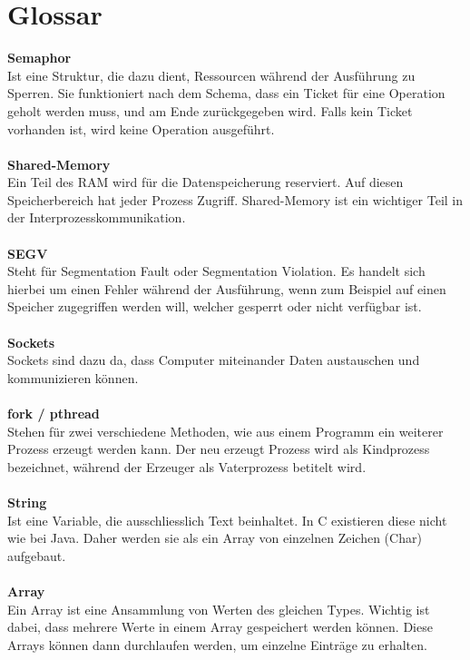 \documentclass[12pt,a4paper,ngerman]{report}
\begin{document}
\chapter*{Glossar}
\textbf{Semaphor}\\
Ist eine Struktur, die dazu dient, Ressourcen während der Ausführung zu Sperren. Sie funktioniert nach dem Schema, dass ein Ticket für eine Operation geholt werden muss, und am Ende zurückgegeben wird. Falls kein Ticket vorhanden ist, wird keine Operation ausgeführt.\\
\\
\textbf{Shared-Memory}\\
Ein Teil des RAM wird für die Datenspeicherung reserviert. Auf diesen Speicherbereich hat jeder Prozess Zugriff. Shared-Memory ist ein wichtiger Teil in der Interprozesskommunikation.\\
\\
\textbf{SEGV}\\
Steht für Segmentation Fault oder Segmentation Violation. Es handelt sich hierbei um einen Fehler während der Ausführung, wenn zum Beispiel auf einen Speicher zugegriffen werden will, welcher gesperrt oder nicht verfügbar ist. \\
\\
\textbf{Sockets}\\
Sockets sind dazu da, dass Computer miteinander Daten austauschen und kommunizieren können. \\
\\
\textbf{fork / pthread}\\
Stehen für zwei verschiedene Methoden, wie aus einem Programm ein weiterer Prozess erzeugt werden kann. Der neu erzeugt Prozess wird als Kindprozess bezeichnet, während der Erzeuger als Vaterprozess betitelt wird.\\
\\
\textbf{String}\\
Ist eine Variable, die ausschliesslich Text beinhaltet. In C existieren diese nicht wie bei Java. Daher werden sie als ein Array von einzelnen Zeichen (Char) aufgebaut.\\
\\
\textbf{Array}\\
Ein Array ist eine Ansammlung von Werten des gleichen Types. Wichtig ist dabei, dass mehrere Werte in einem Array gespeichert werden können. Diese Arrays können dann durchlaufen werden, um einzelne Einträge zu erhalten.


\nocite{socketserver}
\nocite{fork1}
\nocite{fork2}
\nocite{socketclient}
\nocite{stcmp}
\nocite{substring}
\nocite{gitbk}
\nocite{semctl}
\nocite{unix_environment}
\end{document}
